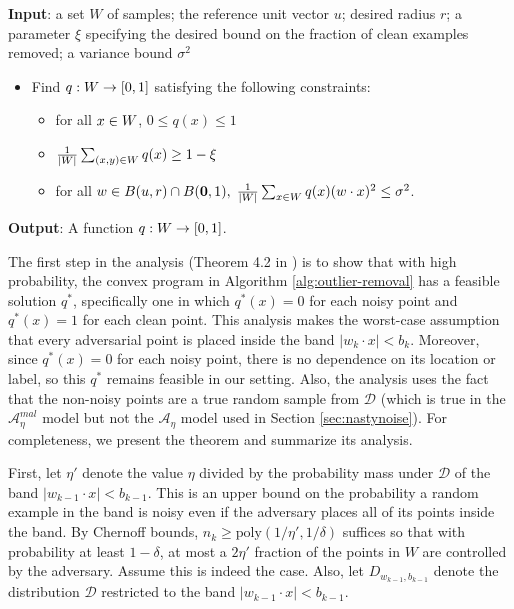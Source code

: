 \documentclass[11pt]{article}
\newcommand{\reg}{\color{black}}
\newcommand{\0}{\mathbf{0}}
\newcommand{\1}{\mathbf{1}}
\newcommand{\cA}{\mathcal{A}}
\newcommand{\cD}{\mathcal{D}}
\begin{document}
\begin{algorithm}[h]
\caption{\label{alg:outlier-removal}{\sc Localized soft outlier removal procedure} \cite{awasthi2017power}
}

 \textbf{Input}: a set {\reg $W$} of samples;
                the reference unit vector $u$;
                desired radius $r$;
                a parameter $\xi$ specifying the desired bound on the fraction of clean examples removed;
                a variance bound $\sigma^2$
\begin{itemize}
\item[1.] Find $q: {\reg W} \rightarrow [0,1]$ satisfying the following constraints:
\begin{itemize}
\item[a.] for all $x \in {\reg W}$, $0 \leq q(x) \leq 1$
\item[b.] $\frac{1}{\reg |W|} \sum_{(x,y) \in {\reg W}} q(x) \geq 1 - \xi$
\item[c.] for all
$w \in B(u, r) \cap B({\bf 0},1),
\; \frac{1}{\reg |W|} \sum_{x \in {\reg W}} q(x) (w\cdot x)^2   \leq \sigma^2$.
\end{itemize}
\end{itemize}
\textbf{Output}: A function $q: {\reg W} \rightarrow [0,1]$.
\end{algorithm}


The first step in the analysis (Theorem 4.2 in \cite{awasthi2017power}) is to show that with high probability, the convex program in Algorithm \ref{alg:outlier-removal} has a feasible solution $q^*$, specifically one in which $q^*(x)=0$ for each noisy point and $q^*(x)=1$ for each clean point.  This analysis makes the worst-case assumption that every adversarial point is placed inside the band $|{w}_{k}\cdot x| < b_k$.  Moreover, since $q^*(x)=0$ for each noisy point, there is no dependence on its location or label, so this $q^*$ remains feasible in our setting. Also, the analysis uses the fact that the non-noisy points are a true random sample from $\cD$ (which is true in the $\cA^{mal}_\eta$ model but not the $\cA_\eta$ model used in Section \ref{sec:nastynoise}). For completeness, we present the theorem and summarize its analysis.

First, let $\eta'$ denote the value $\eta$ divided by the probability mass under $\cD$ of the band $|{w}_{k-1}\cdot x| < b_{k-1}$.  This is an upper bound on the probability a random example in the band is noisy even if the adversary places all of its points inside the band.  By Chernoff bounds, $n_{k} \geq \mathrm{poly}(1/\eta', 1/\delta)$ suffices so that with probability at least $1 - \delta$, at most a $2 \eta'$ fraction of the points in $W$ are controlled by the adversary.  Assume this is indeed the case.  Also, let $D_{w_{k-1}, b_{k-1}}$ denote the distribution $\cD$ restricted to the band  $|{w}_{k-1}\cdot x| < b_{k-1}$.
\end{document}
